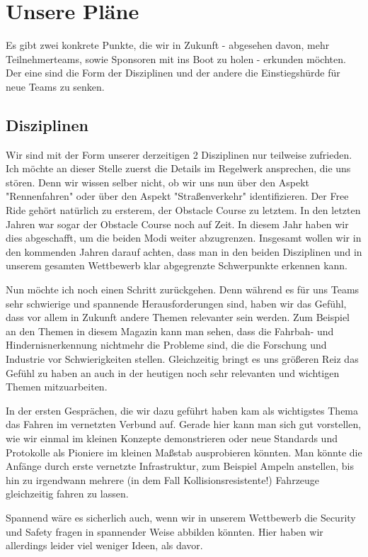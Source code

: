 \section{Unsere Pläne}
Es gibt zwei konkrete Punkte, die wir in Zukunft - abgesehen 
davon, mehr Teilnehmerteams, sowie Sponsoren mit ins Boot zu holen -
erkunden möchten. 
Der eine sind die Form der Disziplinen und der andere die Einstiegshürde
für neue Teams zu senken.

\subsection{Disziplinen}
Wir sind mit der Form unserer derzeitigen 2 Disziplinen nur teilweise zufrieden.
Ich möchte an dieser Stelle zuerst die Details im Regelwerk
ansprechen, die uns stören.
Denn wir wissen selber nicht, ob wir uns nun über den Aspekt "Rennenfahren"
oder über den Aspekt "Straßenverkehr" identifizieren. 
Der Free Ride gehört natürlich zu ersterem, der Obstacle Course zu letztem.
In den letzten Jahren war sogar der Obstacle Course noch auf Zeit.
In diesem Jahr haben wir dies abgeschafft, um die beiden Modi weiter abzugrenzen.
Insgesamt wollen wir in den kommenden Jahren darauf achten, dass man in den
beiden Disziplinen und in unserem gesamten Wettbewerb klar abgegrenzte Schwerpunkte 
erkennen kann.

Nun möchte ich noch einen Schritt zurückgehen. 
Denn während es für uns Teams sehr schwierige und spannende Herausforderungen sind, 
haben wir das Gefühl, dass vor allem in Zukunft andere
Themen relevanter sein werden. 
Zum Beispiel an den Themen in diesem Magazin kann man sehen, dass die Fahrbah- und
Hindernisnerkennung nichtmehr die Probleme sind, die die Forschung und Industrie
vor Schwierigkeiten stellen. 
Gleichzeitig bringt es uns größeren Reiz das Gefühl zu haben an auch in der heutigen 
noch sehr relevanten und wichtigen Themen mitzuarbeiten. 

In der ersten Gesprächen, die wir dazu geführt haben kam als wichtigstes Thema 
das Fahren im vernetzten Verbund auf. Gerade hier kann man sich gut vorstellen,
wie wir einmal im kleinen Konzepte demonstrieren oder neue Standards und Protokolle
als Pioniere im kleinen Maßstab ausprobieren könnten. Man könnte die Anfänge 
durch erste vernetzte Infrastruktur, zum Beispiel Ampeln anstellen, bis hin zu
irgendwann mehrere (in dem Fall Kollisionsresistente!) Fahrzeuge gleichzeitig 
fahren zu lassen.

Spannend wäre es sicherlich auch, wenn wir in unserem Wettbewerb die
Security und Safety fragen in spannender Weise abbilden könnten. Hier
haben wir allerdings leider viel weniger Ideen, als davor.

